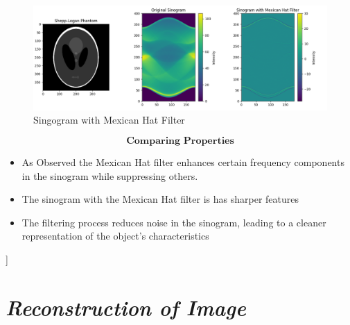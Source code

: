 \documentclass{article}
\begin{document}
\newpage
\begin{figure}
    \centering
    \includegraphics[width=1.4\linewidth]{sinogram_filter.png}
    \caption{Singogram with Mexican Hat Filter}
    \label{fig:enter-label}
\end{figure}
$$\textbf{Comparing Properties}$$
\begin{itemize}
    \item As Observed the Mexican Hat filter enhances certain frequency components in the sinogram while suppressing others.
    \item The sinogram with the Mexican Hat filter is has sharper features
    \item The filtering process  reduces  noise in the sinogram, leading to a cleaner representation of the object's  characteristics
\end{itemize}
\newpage
]\section{\textit{Reconstruction of  Image  }}
\end{document}
